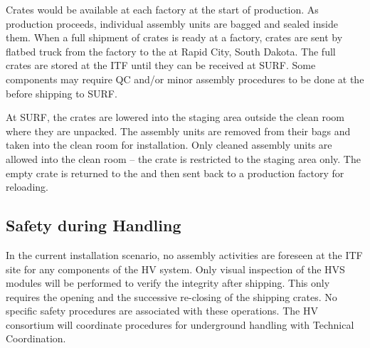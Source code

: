 Crates would be available at each factory at the start of production. %
As production proceeds, individual assembly units are bagged and sealed inside them.
When a full shipment of crates is ready at a factory, crates are sent by flatbed truck from the factory to the  at Rapid City, South Dakota.  The full crates are stored at the ITF until they can be received at SURF.  Some components may require QC and/or minor assembly procedures to be done at the  before shipping to SURF.

At SURF, the crates are lowered into the staging area outside the clean room where they are unpacked. The assembly units are removed from their bags and taken into the clean room for installation. Only cleaned assembly units are allowed into the clean room -- the crate is restricted to the staging area only. The empty crate is returned to the  and then sent back to a production factory for reloading. 


\subsection{Safety during Handling} %
\label{sec:fdsp-hv-transport-safety}


In the current installation scenario, no assembly activities are foreseen at the ITF site for any components of the HV system. Only visual inspection of the HVS modules will be performed to verify the integrity after shipping. This only requires the opening and the successive re-closing of the shipping crates. No specific safety procedures are associated with these operations. The HV consortium will coordinate procedures for underground handling with Technical Coordination.

